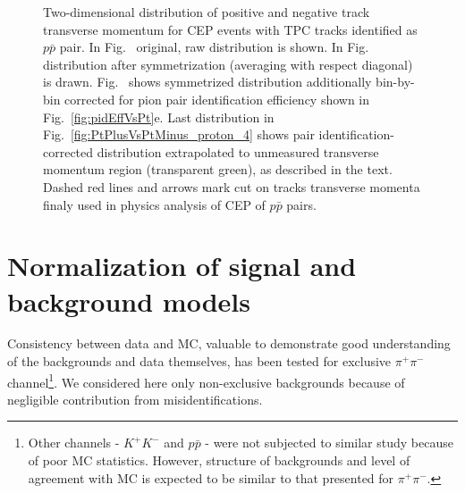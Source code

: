\begin{figure}[h]
\caption[Two-dimensional distribution of positive and negative track transverse momentum for CEP $p\bar{p}$ events.]{Two-dimensional distribution of positive and negative track transverse momentum for CEP events with TPC tracks identified as $p\bar{p}$ pair. In Fig.~ original, raw distribution is shown. In Fig.~ distribution after symmetrization (averaging with respect diagonal) is drawn. Fig.~ shows symmetrized distribution additionally bin-by-bin corrected for pion pair identification efficiency shown in Fig.~\ref{fig:pidEffVsPt}e. Last distribution in Fig.~\ref{fig:PtPlusVsPtMinus_proton_4} shows pair identification-corrected distribution extrapolated to unmeasured transverse momentum region (transparent green), as described in the text. Dashed red lines and arrows mark cut on tracks transverse momenta finaly used in physics analysis of CEP of $p\bar{p}$ pairs.}\label{fig:PtPlusVsPtMinus_proton}
\end{figure}







\section{Normalization of signal and background models}\label{sec:bkgdSignalNorm}


Consistency between data and MC, valuable to demonstrate good understanding of the backgrounds and data themselves, has been tested for exclusive $\pi^{+}\pi^{-}$ channel\footnote{Other channels - $K^{+}K^{-}$ and $p\bar{p}$ - were not subjected to similar study because of poor MC statistics. However, structure of backgrounds and level of agreement with MC is expected to be similar to that presented for $\pi^{+}\pi^{-}$.}. We considered here only non-exclusive backgrounds because of negligible contribution from misidentifications.

